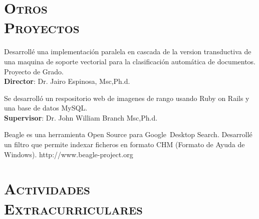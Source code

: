 \begin{resume}
\section{\textsc{Otros\\  Proyectos}}

\begin{position}
Desarroll\'{e} una implementaci\'{o}n  paralela en cascada de la version transductiva de una maquina de soporte vectorial
para la clasificaci\'{o}n autom\'{a}tica de documentos. Proyecto de Grado.\\
\textbf{Director}:  Dr. Jairo Espinosa, Msc,Ph.d.
\end{position}

\begin{position}
 Se desarroll\'{o} un respositorio web de imagenes de rango usando Ruby on Rails y una base de datos MySQL. \\
 \textbf{Supervisor}: Dr. John William Branch Msc,Ph.d.
\end{position}

\begin{position}
Beagle es una herramienta Open Source para Google\texttrademark  \  Desktop Search. Desarroll\'{e} un filtro que permite
indexar ficheros en formato CHM (Formato de Ayuda de Windows).
http://www.beagle-project.org
\end{position}

\section{\textsc{Actividades \\ Extracurriculares }}


\end{resume}
